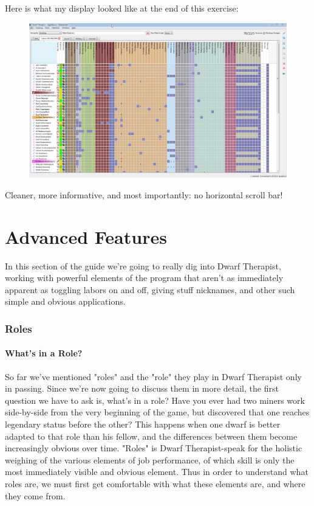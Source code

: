 \documentclass[]{article}
\begin{document}
Here is what my display looked like at the end of this exercise:
\begin{figure}[h!] \centering
\vspace{-5pt}
\includegraphics[scale=.37]{Sec2Fig28}
\vspace{-5pt}
\end{figure}

Cleaner, more informative, and most importantly: no horizontal scroll bar!

%
%

\newpage
\part{Advanced Features}
\label{sec:Advanced Features}

In this section of the guide we're going to really dig into Dwarf Therapist, working with powerful
elements of the program that aren't as immediately apparent as toggling labors on and off, giving stuff
nicknames, and other such simple and obvious applications.

\section{Roles}
\label{sec:Roles}
\subsection{What's in a Role?}
\label{What's in a Role?}
So far we've mentioned "roles" and the "role" they play in  Dwarf Therapist only in passing. Since we're
now going to discuss them in more detail, the first question we have to ask is, what's in a role?
Have you ever had two miners work side-by-side from the very beginning of the game, but
discovered that one reaches legendary status before the other? This happens when one dwarf is
better adapted to that role than his fellow, and the differences between them become increasingly
obvious over time. "Roles" is Dwarf Therapist-speak for the holistic weighing of the various
elements of job performance, of which skill is only the most immediately visible and obvious element.
Thus in order to understand what roles are, we must first get comfortable with what these elements are,
and where they come from.
\end{document}
